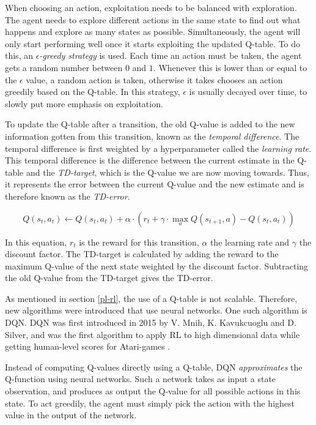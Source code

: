 When choosing an action, exploitation needs to be balanced with exploration. The agent needs to explore different actions in the same state to find out what happens and explore as many states as possible. Simultaneously, the agent will only start performing well once it starts exploiting the updated Q-table. To do this, an \emph{$\epsilon$-greedy strategy} is used. Each time an action must be taken, the agent gets a random number between $0$ and $1$. Whenever this is lower than or equal to the $\epsilon$ value, a random action is taken, otherwise it takes chooses an action greedily based on the Q-table. In this strategy, $\epsilon$ is usually decayed over time, to slowly put more emphasis on exploitation.

To update the Q-table after a transition, the old Q-value is added to the new information gotten from this transition, known as the \emph{temporal difference}. The temporal difference is first weighted by a hyperparameter called the \emph{learning rate}. This temporal difference is the difference between the current estimate in the Q-table and the \emph{TD-target}, which is the Q-value we are now moving towards. Thus, it represents the error between the current Q-value and the new estimate and is therefore known as the \emph{TD-error}.

\begin{equation}
Q(s_t,a_t) \leftarrow Q(s_t,a_t) + \alpha \cdot (r_t + \gamma \cdot \max _{a} Q(s_{t+1},a) - Q(s_t,a_t))
\end{equation}

In this equation, $r_t$ is the reward for this transition, $\alpha$ the learning rate and $\gamma$ the discount factor. The TD-target is calculated by adding the reward to the maximum Q-value of the next state weighted by the discount factor. Subtracting the old Q-value from the TD-target gives the TD-error. 

As mentioned in section \ref{pl-rl}, the use of a Q-table is not scalable. Therefore, new algorithms were introduced that use neural networks. One such algorithm is DQN. DQN was first introduced in 2015 by V. Mnih, K. Kavukcuoglu and D. Silver, and was the first algorithm to apply RL to high dimensional data while getting human-level scores for Atari-games \cite{dqn}.

Instead of computing Q-values directly using a Q-table, DQN \emph{approximates} the Q-function using neural networks. Such a network takes as input a state observation, and produces as output the Q-value for all possible actions in this state. To act greedily, the agent must simply pick the action with the highest value in the output of the network.

